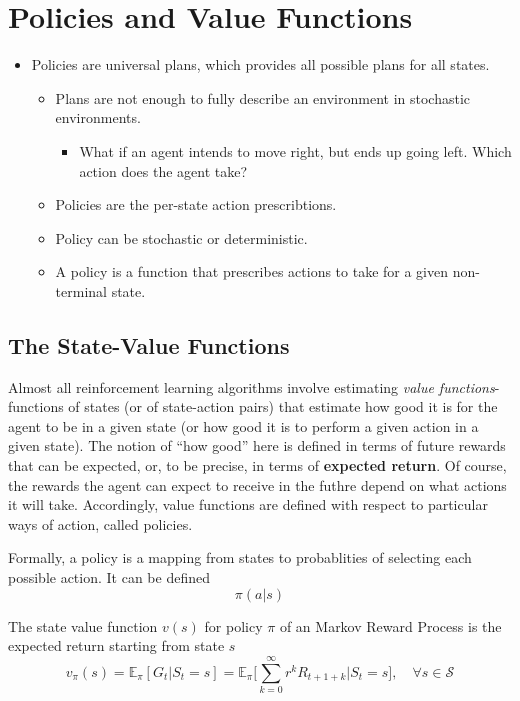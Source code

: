 \section{Policies and Value Functions}
\begin{itemize}
	\item Policies are universal plans, which provides all possible plans for all states. 
		\begin{itemize}
			\item Plans are not enough to fully describe an environment in stochastic environments.
				\begin{itemize}
					\item What if an agent intends to move right, but ends up going left. Which action does the agent take?
				\end{itemize}
			\item Policies are the per-state action prescribtions.
			\item Policy can be stochastic or deterministic.
			\item A policy is a function that prescribes actions to take for a given non-terminal state.
		\end{itemize}
\end{itemize}

\subsection{The State-Value Functions}

Almost all reinforcement learning algorithms involve estimating \textit{value functions}-functions of states (or of state-action pairs) that estimate how good it is for the agent to be in a given state (or how good it is to perform a given action in a given state). The notion of ``how good'' here is defined in terms of future rewards that can be expected, or, to be precise, in terms of \textbf{expected return}. Of course, the rewards the agent can expect to receive in the futhre depend on what actions it will take. Accordingly, value functions are defined with respect to particular ways of action, called policies. 

Formally, a policy is a mapping from states to probablities of selecting each possible action. It can be defined 
$$\pi(a|s)$$


\begin{definition}
	The state value function $v(s)$ for policy $\pi$ of an Markov Reward Process is the expected return starting from state $s$
	$$v_{\pi}(s) = \mathbb{E}_\pi[G_t|S_t=s]=\mathbb{E}_\pi \Bigg[\sum_{k=0}^\infty r^kR_{t+1+k}\Big|S_t=s\Bigg], \quad \forall s\in \mathcal{S}$$
\end{definition}

